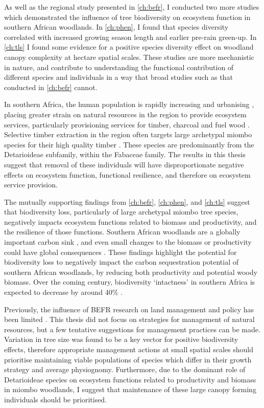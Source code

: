 \begin{refsection}
As well as the regional study presented in \autoref{ch:befr}, I conducted two more studies which demonstrated the influence of tree biodiversity on ecosystem function in southern African woodlands. In \autoref{ch:phen}, I found that species diversity correlated with increased growing season length and earlier pre-rain green-up. In \autoref{ch:tls} I found some evidence for a positive species diversity effect on woodland canopy complexity at hectare spatial scales. These studies are more mechanistic in nature, and contribute to understanding the functional contribution of different species and individuals in a way that broad studies such as that conducted in \autoref{ch:befr} cannot. 

In southern Africa, the human population is rapidly increasing and urbanising \citep{UN2018}, placing greater strain on natural resources in the region to provide ecosystem services, particularly provisioning services for timber, charcoal and fuel wood \citep{Wessels2013, Ryan2016}. Selective timber extraction in the region often targets large archetypal miombo species for their high quality timber \citep{Sitoe2010}. These species are predominantly from the Detarioideae subfamily, within the Fabaceae family. The results in this thesis suggest that removal of these individuals will have disproportionate negative effects on ecosystem function, functional resilience, and therefore on ecosystem service provision. 

The mutually supporting findings from \autoref{ch:befr}, \autoref{ch:phen}, and \autoref{ch:tls} suggest that biodiversity loss, particularly of large archetypal miombo tree species, negatively impacts ecosystem functions related to biomass and productivity, and the resilience of those functions. Southern African woodlands are a globally important carbon sink \citep{Grace2006, Pelletier2018}, and even small changes to the biomass or productivity could have global consequences \citep{Williams2005}. These findings highlight the potential for biodiversity loss to negatively impact the carbon sequestration potential of southern African woodlands, by reducing both productivity and potential woody biomass. Over the coming century, biodiversity `intactness' in southern Africa is expected to decrease by around 40\% \citep{Biggs2008}.

Previously, the influence of BEFR research on land management and policy has been limited \citep{Manning2019}. This thesis did not focus on strategies for management of natural resources, but a few tentative suggestions for management practices can be made. Variation in tree size was found to be a key vector for positive biodiversity effects, therefore appropriate management actions at small spatial scales should prioritise maintaining viable populations of species which differ in their growth strategy and average physiognomy. Furthermore, due to the dominant role of Detarioideae species on ecosystem functions related to productivity and biomass in miombo woodlands, I suggest that maintenance of these large canopy forming individuals should be prioritised.


\end{refsection}
